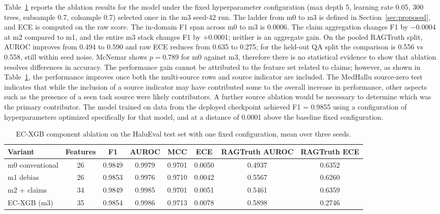 \documentclass[a4paper,fleqn]{cas-sc}
\begin{document}
Table~\ref{tab:ec} reports the ablation results for the model under the fixed hyperparameter configuration (max depth 5, learning rate 0.05, 300 trees, subsample 0.7, colsample 0.7) selected once in the m3 seed-42 run. The ladder from m0 to m3 is defined in Section~\ref{sec:proposed}, and ECE is computed on the raw score. The in-domain F1 span across m0 to m3 is 0.0006. The claim aggregation changes F1 by $-$0.0004 at m2 compared to m1, and the entire m3 stack changes F1 by $+$0.0001; neither is an aggregate gain. On the pooled RAGTruth split, AUROC improves from 0.494 to 0.590 and raw ECE reduces from 0.635 to 0.275; for the held-out QA split the comparison is 0.556 vs 0.558, still within seed noise. McNemar shows $p = 0.789$ for m0 against m3, therefore there is no statistical evidence to show that ablation resolves differences in accuracy. The performance gain cannot be attributed to the feature set related to claims; however, as shown in Table~\ref{tab:ec}, the performance improves once both the multi-source rows and source indicator are included. The MedHallu source-zero test indicates that while the inclusion of a source indicator may have contributed some to the overall increase in performance, other aspects such as the presence of a seen task source were likely contributors. A further source ablation would be necessary to determine which was the primary contributor. The model trained on data from the deployed checkpoint achieved F1 = 0.9855 using a configuration of hyperparameters optimized specifically for that model, and at a distance of 0.0001 above the baseline fixed configuration.

\begin{table}[pos=htbp]
  \centering
  \caption{EC-XGB component ablation on the HaluEval test set with one fixed configuration, mean over three seeds.}
  \label{tab:ec}
  \begin{tabular}{lccccccc}
    \toprule
    \textbf{Variant} & \textbf{Features} & \textbf{F1} & \textbf{AUROC} & \textbf{MCC} & \textbf{ECE} & \textbf{RAGTruth AUROC} & \textbf{RAGTruth ECE} \\
    \midrule
    m0 conventional  & 26                & 0.9849      & 0.9979         & 0.9701       & 0.0050       & 0.4937                  & 0.6352                \\
    m1 debias        & 26                & 0.9853      & 0.9976         & 0.9710       & 0.0042       & 0.5567                  & 0.6260                \\
    m2 + claims      & 34                & 0.9849      & 0.9985         & 0.9701       & 0.0051       & 0.5461                  & 0.6359                \\
    EC-XGB (m3)      & 35                & 0.9854      & 0.9986         & 0.9713       & 0.0078       & 0.5898                  & 0.2746                \\
    \bottomrule
  \end{tabular}
\end{table}
\end{document}
